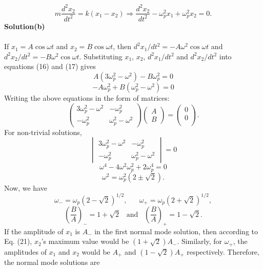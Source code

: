 \documentclass[12pt,a4paper]{article}
\begin{document}
\begin{equation}
  m\frac{d^2x_2}{dt^2}=k(x_1-x_2)\Rightarrow\frac{d^2x_2}{dt^2}-\omega_p^2x_1+\omega_p^2x_2=0.
\end{equation}
\textbf{Solution(b)}
\\
\\If $x_1=A\cos\omega t$ and $x_2=B\cos\omega t$, then $d^2x_1/dt^2=-A\omega^2\cos\omega t$ and $d^2x_2/dt^2=-B\omega^2\cos\omega t$. Substituting $x_1$, $x_2$, $d^2x_1/dt^2$ and $d^2x_2/dt^2$ into equations (16) and (17) gives
\begin{equation}
    A\left(3\omega_p^2-\omega^2\right)-B\omega_p^2=0
\end{equation}
\begin{equation}
   -A\omega_p^2+B\left(\omega_p^2-\omega^2\right)=0
\end{equation}
Writing the above equations in the form of matrices:
\begin{equation}
    \begin{pmatrix}
        3\omega_p^2-\omega^2 & -\omega_p^2\\
        -\omega_p^2 & \omega_p^2-\omega^2
    \end{pmatrix}
    \begin{pmatrix}
        A\\
        B
    \end{pmatrix}=
    \begin{pmatrix}
        0\\
        0\\
    \end{pmatrix}
    .
\end{equation}
For non-trivial solutions,
\[\begin{vmatrix}
     3\omega_p^2-\omega^2 & -\omega_p^2\\
        -\omega_p^2 & \omega_p^2-\omega^2
\end{vmatrix}=0\]
\[\omega^4-4\omega^2\omega_p^2+2\omega_p^4=0\]
\[\omega^2=\omega_p^2\left(2\pm\sqrt{2}\right).\]
Now, we have
  \[\omega_-=\omega_p\left(2-\sqrt{2}\right)^{1/2},\,\,\,\,\,\,\,\,\,\,\omega_+=\omega_p\left(2+\sqrt{2}\right)^{1/2},\]
\begin{equation}
    \left(\frac{B}{A}\right)_-=1+\sqrt{2}\,\,\,\,\,\text{and}\,\,\,\,\,\left(\frac{B}{A}\right)_+=1-\sqrt{2}.
\end{equation}
If the amplitude of $x_1$ is $A_-$ in the first normal mode solution, then according to Eq. (21), $x_2$'s maximum value would be $\left(1+\sqrt{2}\right)A_-$. Similarly, for $\omega_+$, the amplitudes of $x_1$ and $x_2$ would be $A_+$ and $\left(1-\sqrt{2}\right)A_+$ respectively. Therefore, the normal mode solutions are
\end{document}
